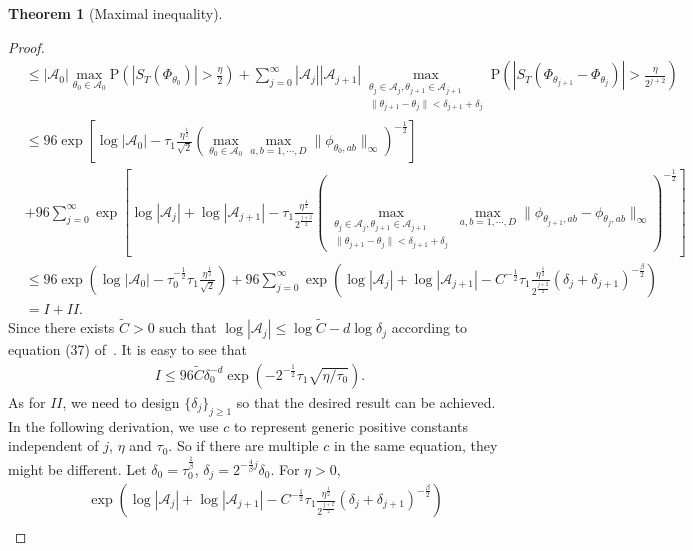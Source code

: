 \documentclass[11pt]{article}
\numberwithin{equation}{section}
\theoremstyle{plain}
\theoremstyle{definition}
\theoremstyle{definition}
\theoremstyle{assumption}
\theoremstyle{proposition}
\theoremstyle{proposition}
\theoremstyle{example}
\theoremstyle{lemma}
\theoremstyle{theorem}
\newtheorem{theorem}{Theorem}[section]
\theoremstyle{remark}
\begin{document}
\begin{theorem}[Maximal inequality]
\begin{proof}
\begin{align*}
&\leqslant  |\mathcal{A}_0|\max_{\theta_0\in\mathcal{A}_0}\mathrm{P}\left(|S_T(\Phi_{\theta_0})|>\frac{\eta}{2}\right) 
+ \sum_{j=0}^{\infty}|\mathcal{A}_j||\mathcal{A}_{j+1}|\max_{\substack{\theta_j\in\mathcal{A}_j, \theta_{j+1}\in\mathcal{A}_{j+1} \\ \|\theta_{j+1} - \theta_j\|< \delta_{j+1} + \delta_j}}\mathrm{P}\left(\left| S_T(\Phi_{\theta_{j+1}} - \Phi_{\theta_j})\right|>\frac{\eta}{2^{j+2}}\right) \\
&\leqslant 96\exp\left[\log|\mathcal{A}_0|  - \tau_1  \frac{\eta^\frac{1}{2}}{\sqrt{2}}\left(\max_{\theta_0\in\mathcal{A}_0}\max_{a,b=1,\cdots,D}\|\phi_{\theta_0, ab}\|_{\infty}\right)^{-\frac{1}{2}}\right] \\
&+ 96\sum_{j=0}^{\infty}\exp\left[\log|\mathcal{A}_j| + \log|\mathcal{A}_{j+1}| - \tau_1 \frac{\eta^{\frac{1}{2}}}{2^{\frac{j+2}{2}}}\left(\max_{\substack{\theta_j\in\mathcal{A}_j, \theta_{j+1}\in\mathcal{A}_{j+1} \\\|\theta_{j+1} - \theta_j\|< \delta_{j+1} + \delta_j}}\max_{a,b=1,\cdots,D}\|\phi_{\theta_{j+1}, ab} - \phi_{\theta_{j}, ab}\|_{\infty}\right)^{-\frac{1}{2}} \right] \\
&\leqslant 96\exp\left(\log|\mathcal{A}_{0}| - \tau_0^{-\frac{1}{2}}\tau_1  \frac{\eta^{\frac{1}{2}}}{\sqrt{2}}\right)
+ 96\sum_{j=0}^{\infty}\exp\left(\log|\mathcal{A}_{j}|+\log|\mathcal{A}_{j+1}| -  C^{-\frac{1}{2}}\tau_1\frac{\eta^{\frac{1}{2}}}{2^{\frac{j+2}{2}}} (\delta_j+\delta_{j+1})^{-\frac{\beta}{2}}\right) \\
&=I + II.
\end{align*}
Since there exists $\tilde{C}>0$ such that $\log|\mathcal{A}_j|\leqslant \log \tilde{C} - d\log\delta_j$ according to equation (37) of~\citet{covnum2}. It is easy to see that 
\begin{align*}
I  \leqslant 96\tilde{C}\delta_0^{-d} \exp(-2^{-\frac{1}{2}}\tau_1 \sqrt{\eta/\tau_0}).
\end{align*}
As for $II$, we need to design $\{\delta_j\}_{j\geqslant1}$ so that the desired result can be achieved. In the following derivation, we use $c$ to represent generic positive constants independent of $j$, $\eta$ and $\tau_0$. So if there are multiple $c$ in the same equation, they might be different. Let $\delta_0 = \tau_0^{\frac{1}{\beta}}$, $\delta_j = 2^{-\frac{4}{\beta}j}\delta_0$. For $\eta>0$,
\begin{align*}
&\exp\left(\log|\mathcal{A}_{j}|+\log|\mathcal{A}_{j+1}| -  C^{-\frac{1}{2}}\tau_1\frac{\eta^{\frac{1}{2}}}{2^{\frac{j+2}{2}}} (\delta_j+\delta_{j+1})^{-\frac{\beta}{2}}\right) \\

\end{align*}
\end{proof}
\end{theorem}
\end{document}
